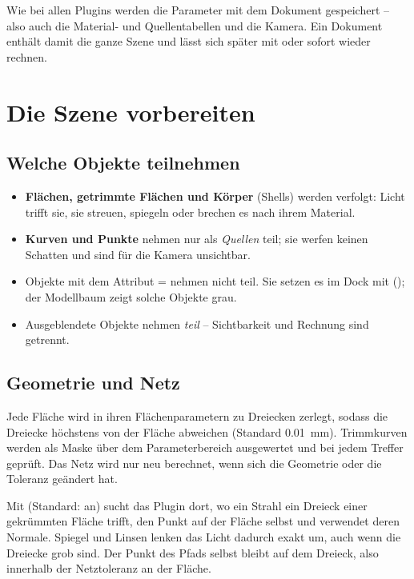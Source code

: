 Wie bei allen Plugins werden die Parameter mit dem Dokument gespeichert -- also auch die
Material- und Quellentabellen und die Kamera. Ein Dokument enthält damit die ganze Szene und
lässt sich später mit  oder  sofort wieder rechnen.

\section{Die Szene vorbereiten}\label{sec:pt-szene}

\subsection{Welche Objekte teilnehmen}

\begin{itemize}
  \item \textbf{Flächen, getrimmte Flächen und Körper} (Shells) werden verfolgt: Licht trifft
    sie, sie streuen, spiegeln oder brechen es nach ihrem Material.
  \item \textbf{Kurven und Punkte} nehmen nur als \emph{Quellen} teil; sie werfen keinen
    Schatten und sind für die Kamera unsichtbar.
  \item Objekte mit dem Attribut  =  nehmen nicht teil. Sie
    setzen es im Dock  mit  ();
    der Modellbaum zeigt solche Objekte grau.
  \item Ausgeblendete Objekte nehmen \emph{teil} -- Sichtbarkeit und Rechnung sind getrennt.
\end{itemize}

\subsection{Geometrie und Netz}

Jede Fläche wird in ihren Flächenparametern zu Dreiecken zerlegt, sodass die Dreiecke höchstens
 von der Fläche abweichen (Standard \SI{0.01}{\milli\metre}). Trimmkurven
werden als Maske über dem Parameterbereich ausgewertet und bei jedem Treffer geprüft. Das Netz
wird nur neu berechnet, wenn sich die Geometrie oder die Toleranz geändert hat.

Mit  (Standard: an) sucht das Plugin dort, wo ein Strahl ein
Dreieck einer gekrümmten Fläche trifft, den Punkt auf der Fläche selbst und verwendet deren
Normale. Spiegel und Linsen lenken das Licht dadurch exakt um, auch wenn die Dreiecke grob sind.
Der Punkt des Pfads selbst bleibt auf dem Dreieck, also innerhalb der Netztoleranz an der Fläche.

